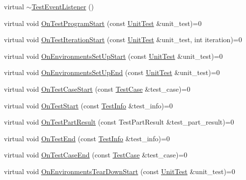 \begin{DoxyCompactItemize}
\item 
virtual \mbox{\hyperlink{classtesting_1_1_test_event_listener_a4512d19e7a108ec4926239ec1ea85d63}{$\sim$\+Test\+Event\+Listener}} ()
\item 
virtual void \mbox{\hyperlink{classtesting_1_1_test_event_listener_a5f6c84f39851e8a603a2d2e10063816b}{On\+Test\+Program\+Start}} (const \mbox{\hyperlink{classtesting_1_1_unit_test}{Unit\+Test}} \&unit\+\_\+test)=0
\item 
virtual void \mbox{\hyperlink{classtesting_1_1_test_event_listener_a60cc09b7907cb329d152eb5e7133bdeb}{On\+Test\+Iteration\+Start}} (const \mbox{\hyperlink{classtesting_1_1_unit_test}{Unit\+Test}} \&unit\+\_\+test, int iteration)=0
\item 
virtual void \mbox{\hyperlink{classtesting_1_1_test_event_listener_aa6502e534919605be45f26a6daf9a40c}{On\+Environments\+Set\+Up\+Start}} (const \mbox{\hyperlink{classtesting_1_1_unit_test}{Unit\+Test}} \&unit\+\_\+test)=0
\item 
virtual void \mbox{\hyperlink{classtesting_1_1_test_event_listener_aaa1021d75f5dbf3f05c829c1cc520341}{On\+Environments\+Set\+Up\+End}} (const \mbox{\hyperlink{classtesting_1_1_unit_test}{Unit\+Test}} \&unit\+\_\+test)=0
\item 
virtual void \mbox{\hyperlink{classtesting_1_1_test_event_listener_ab4ed885d63f5bbff8076c1329b3dfe36}{On\+Test\+Case\+Start}} (const \mbox{\hyperlink{classtesting_1_1_test_case}{Test\+Case}} \&test\+\_\+case)=0
\item 
virtual void \mbox{\hyperlink{classtesting_1_1_test_event_listener_ab4f6a0ca16ae75daf385b3b5914e1048}{On\+Test\+Start}} (const \mbox{\hyperlink{classtesting_1_1_test_info}{Test\+Info}} \&test\+\_\+info)=0
\item 
virtual void \mbox{\hyperlink{classtesting_1_1_test_event_listener_a054f8705c883fa120b91473aff38f2ee}{On\+Test\+Part\+Result}} (const Test\+Part\+Result \&test\+\_\+part\+\_\+result)=0
\item 
virtual void \mbox{\hyperlink{classtesting_1_1_test_event_listener_abb1c44525ef038500608b5dc2f17099b}{On\+Test\+End}} (const \mbox{\hyperlink{classtesting_1_1_test_info}{Test\+Info}} \&test\+\_\+info)=0
\item 
virtual void \mbox{\hyperlink{classtesting_1_1_test_event_listener_ae61985e2ef76ac78379b077be57a9c36}{On\+Test\+Case\+End}} (const \mbox{\hyperlink{classtesting_1_1_test_case}{Test\+Case}} \&test\+\_\+case)=0
\item 
virtual void \mbox{\hyperlink{classtesting_1_1_test_event_listener_a468b5e6701bcb86cb2c956caadbba5e4}{On\+Environments\+Tear\+Down\+Start}} (const \mbox{\hyperlink{classtesting_1_1_unit_test}{Unit\+Test}} \&unit\+\_\+test)=0

\end{DoxyCompactItemize}
